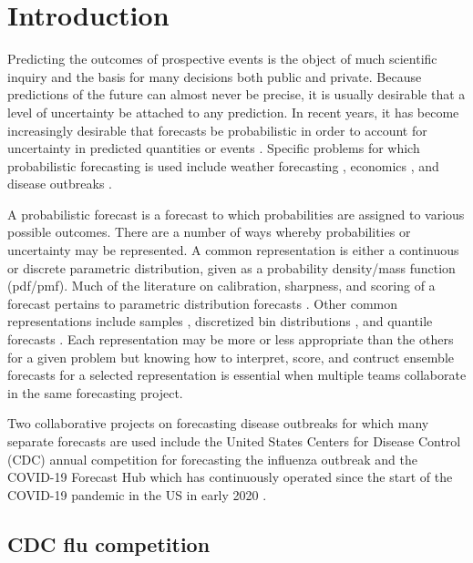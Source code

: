 \documentclass[11pt,notitlepage]{isuthesis}
\begin{document}
\chapter{Introduction}

Predicting the outcomes of prospective events is the object of much scientific
inquiry and the basis for many decisions both public and private. Because 
predictions of the future can almost never be precise, it is usually desirable
that a level of uncertainty be attached to any prediction. In recent years, it
has become increasingly desirable that forecasts be probabilistic in order to 
account for uncertainty in predicted quantities or events 
\cite{gneiting2014probabilistic}. Specific problems for 
which probabilistic forecasting is used include weather forecasting
\cite{baran2018combining}, economics \cite{groen2013real}, and disease outbreaks
\cite{yamana2016superensemble}.

A probabilistic forecast is a forecast to which probabilities are assigned to 
various possible outcomes. There are a number of ways whereby probabilities or 
uncertainty may be represented. A common representation is either a continuous 
or
discrete parametric distribution, given as a probability density/mass function 
(pdf/pmf). Much of the literature 
on calibration, sharpness, and scoring of a forecast pertains to parametric 
distribution forecasts
\cite{gneiting2007probabilistic,gneiting2013combining,baran2018combining}.
Other common representations include samples \cite{krueger2016probabilistic}, 
discretized bin distributions \cite{mcgowan2019collaborative},
and quantile forecasts \cite{taylor2021evaluating, bracher2021evaluating}. 
Each representation may be more or less 
appropriate than the others for a given problem but knowing how to interpret, 
score, and contruct ensemble forecasts for a selected representation is 
essential when multiple teams collaborate in the same forecasting project.


Two collaborative projects on forecasting disease outbreaks for which many 
separate forecasts 
are used include the United States Centers for Disease Control (CDC)
annual competition for forecasting the influenza outbreak \cite{cdcflusight}
and the COVID-19 Forecast Hub which has 
continuously operated since the start of the COVID-19 pandemic in the US in 
early 2020 \cite{Cramer2021-hub-dataset}.

\section{CDC flu competition}
\end{document}
